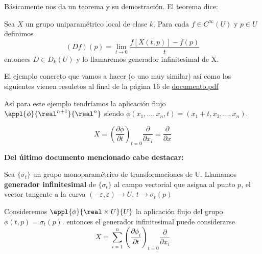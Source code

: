 \begin{problem}[1]
Básicamente nos da un teorema y su demostración. El teorema dice:

Sea $X$ un grupo uniparamétrico local de clase $k$. Para cada $f\in C^{\infty}(U)$ y $p \in U$ definimos
\[(Df)(p)=\lim_{t \to 0}\frac{f[X(t,p)]-f(p)}{t}\]
entonces $D \in D_k(U)$ y lo llamaremos generador infinitesimal de X.

El ejemplo concreto que vamos a hacer (o uno muy similar) así como los siguientes vienen resuletos al final de la página 16 de \href{http://matematicas.unex.es/~ricarfr/EcDiferenciales/LibroEDLat.pdf}{documento.pdf}

Así para este ejemplo tendríamos la aplicación flujo $\appl{\phi}{\real^{n+1}}{\real^n}$ siendo $\phi(x_1,...,x_n,t)=(x_1+t,x_2,...,x_n)$.

\[X = \left(\frac{\partial \phi}{\partial t}\right)_{t=0} \frac{\partial}{\partial x_i}=\frac{\partial}{\partial x}\]


\textbf{Del último documento mencionado cabe destacar:}

\begin{defn}
Sea $\{σ_t\}$ un grupo monoparamétrico de transformaciones de U. Llamamos \textbf{generador infinitesimal} de $\{σ_t\}$ al campo vectorial que asigna al punto $p$, el vector tangente a la curva $(-ε,ε)\to U$, $t \to σ_t(p)$

Consideremos $\appl{\phi}{\real \times U}{U}$ la aplicación flujo del grupo $\phi(t,p)=σ_t(p)$. entonces el generador infinitesimal puede considerarse
\[X = \sum_{i=1}^n \left( \frac{\partial \phi_i}{\partial t}\right)_{t=0}\frac{\partial}{\partial x_i}\]
\end{defn}

\end{problem}

